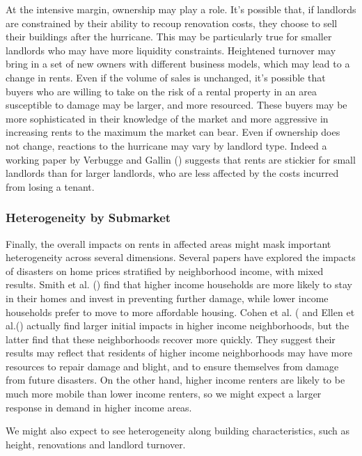 \documentclass[12pt]{article}
\begin{document}
{{{At the intensive margin, ownership may play a role.   It's possible that, if landlords are constrained by their ability to recoup renovation costs, they choose to sell their buildings after the hurricane. This may be particularly true for smaller landlords who may have more liquidity constraints.  Heightened turnover may bring in a set of new owners with different business models, which may lead to a change in rents.   Even if the volume of sales is unchanged, it’s possible that buyers who are willing to take on the risk of a rental property in an area susceptible to damage may be larger, and more resourced.  These buyers may be more sophisticated in their knowledge of the market and more aggressive in increasing rents to the maximum the market can bear. Even if ownership does not change, reactions to the hurricane may vary by landlord type. Indeed a working paper by Verbugge and Gallin (\citeyear{verbrugge_theory_2017}) suggests that rents are stickier for small landlords than for larger landlords, who are less affected by the costs incurred from losing a tenant. 

\subsubsection{Heterogeneity by Submarket}
Finally, the overall impacts on rents in affected areas might mask important heterogeneity across several dimensions.  Several papers have explored the impacts of disasters on home prices stratified by neighborhood income, with mixed results. Smith et al. (\citeyear{smith_adjusting_2006}) find that higher income households are more likely to stay in their homes and invest in preventing further damage, while lower income households prefer to move to more affordable housing. Cohen et al. (\citeyear{cohen_storm_2021} and Ellen et al.(\citeyear{ellen_heterogeneity_2022}) actually find larger initial impacts in higher income neighborhoods, but the latter find that these neighborhoods recover more quickly.  They suggest their results may reflect that residents of higher income neighborhoods may have more resources to repair damage and blight, and to ensure themselves from damage from future disasters.  On the other hand, higher income renters are likely to be much more mobile than lower income renters, so we might expect a larger response in demand in higher income areas.

We might also expect to see heterogeneity along building characteristics, such as height, renovations and landlord turnover.

}}}
\end{document}
